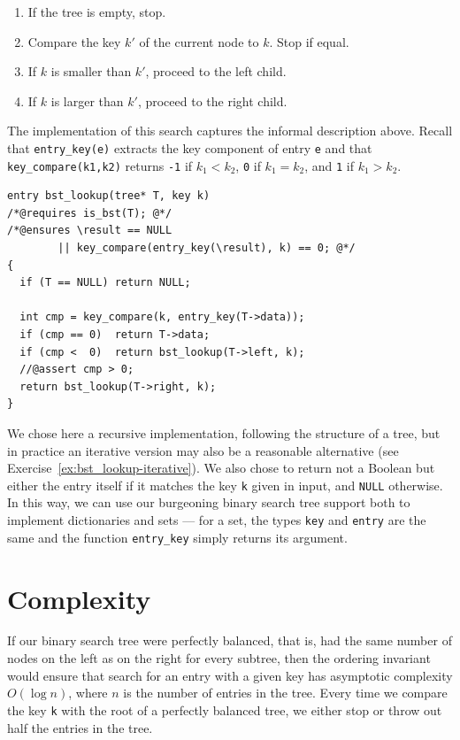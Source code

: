 \begin{enumerate}
\item If the tree is empty, stop.
\item Compare the key $k'$ of the current node to $k$. Stop if equal.
\item If $k$ is smaller than $k'$, proceed to the left child.
\item If $k$ is larger than $k'$, proceed to the right child.
\end{enumerate}
The implementation of this search captures the informal description
above.  Recall that \lstinline'entry_key(e)' extracts the key component
of entry \lstinline'e' and that \lstinline'key_compare(k1,k2)'
returns \lstinline'-1' if $k_1 < k_2$, \lstinline'0' if $k_1 = k_2$,
and \lstinline'1' if $k_1 > k_2$.
\begin{lstlisting}[language={[C0]C}]
entry bst_lookup(tree* T, key k)
/*@requires is_bst(T); @*/
/*@ensures \result == NULL
        || key_compare(entry_key(\result), k) == 0; @*/
{
  if (T == NULL) return NULL;

  int cmp = key_compare(k, entry_key(T->data));
  if (cmp == 0)  return T->data;
  if (cmp <  0)  return bst_lookup(T->left, k);
  //@assert cmp > 0;
  return bst_lookup(T->right, k);
}
\end{lstlisting}
We chose here a recursive implementation, following the structure of a
tree, but in practice an iterative version may also be a reasonable
alternative (see Exercise~\ref{ex:bst_lookup-iterative}).  We also chose
to return not a Boolean but either the entry itself if it matches
the key \lstinline'k' given in input, and \lstinline'NULL' otherwise.
In this way, we can use our burgeoning binary search tree support both
to implement dictionaries and sets --- for a set, the types
\lstinline'key' and \lstinline'entry' are the same and the function
\lstinline'entry_key' simply returns its argument.


\section{Complexity}
\label{sec:bst:complexity}

If our binary search tree were perfectly balanced, that is, had the
same number of nodes on the left as on the right for every subtree,
then the ordering invariant would ensure that search for an entry
with a given key has asymptotic complexity $O(\log n)$, where $n$ is
the number of entries in the tree. Every time we compare the key
\lstinline'k' with the root of a perfectly balanced tree, we either
stop or throw out half the entries in the tree.

